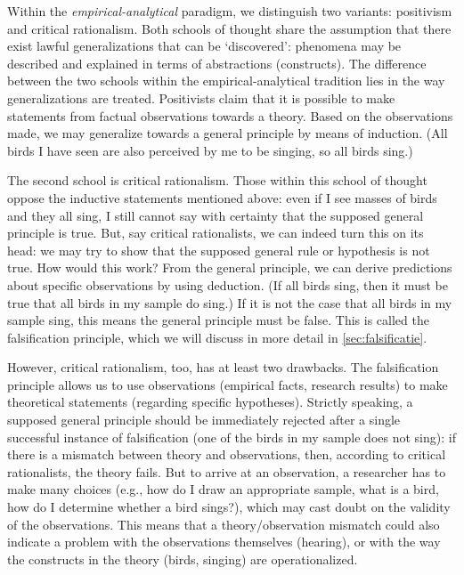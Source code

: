 \documentclass[
]{book}
\begin{document}
Within the \emph{empirical-analytical} paradigm, we distinguish two variants: positivism and critical rationalism. Both schools of thought share the assumption that there exist lawful generalizations that can be `discovered': phenomena may be described and explained in terms of abstractions (constructs). The difference between the two schools within the empirical-analytical tradition lies in the way generalizations are treated. Positivists claim that it is possible to make statements from factual observations towards a theory. Based on the observations made, we may generalize towards a general principle by means of induction. (All birds I have seen are also perceived by me to be singing, so all birds sing.)

The second school is critical rationalism. Those within this school of thought oppose the inductive statements mentioned above: even if I see masses of birds and they all sing, I still cannot say with certainty that the supposed general principle is true. But, say critical rationalists, we can indeed turn this on its head: we may try to show that the supposed general rule or hypothesis is not true. How would this work? From the general principle, we can derive predictions about specific observations by using deduction. (If all birds sing, then it must be true that all birds in my sample do sing.) If it is not the case that all birds in my sample sing, this means the general principle must be false. This is called the falsification principle, which we will discuss in more detail in \ref{sec:falsificatie}.

However, critical rationalism, too, has at least two drawbacks. The falsification principle allows us to use observations (empirical facts, research results) to make theoretical statements (regarding specific hypotheses). Strictly speaking, a supposed general principle should be immediately rejected after a single successful instance of falsification (one of the birds in my sample does not sing): if there is a mismatch between theory and observations, then, according to critical rationalists, the theory fails. But to arrive at an observation, a researcher has to make many choices (e.g., how do I draw an appropriate sample, what is a bird, how do I determine whether a bird sings?), which may cast doubt on the validity of the observations. This means that a theory/observation mismatch could also indicate a problem with the observations themselves (hearing), or with the way the constructs in the theory (birds, singing) are operationalized.
\end{document}
